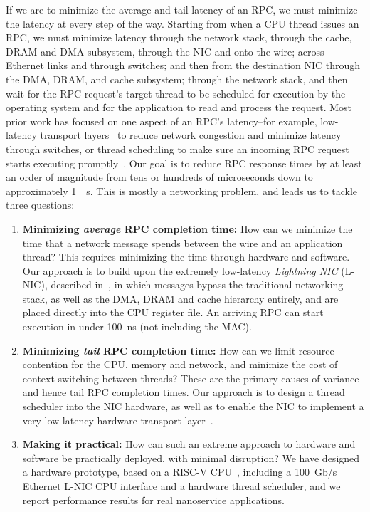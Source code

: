 If we are to minimize the average and tail latency of an RPC, we must minimize the latency at every step of the way. 
Starting from when a CPU thread issues an RPC, we must minimize latency through the network stack, through the cache, DRAM and DMA subsystem, through the NIC and onto the wire; across Ethernet links and through switches; and then from the destination NIC through the DMA, DRAM, and cache subsystem; through the network stack, and then wait for the RPC request's target thread to be scheduled for execution by the operating system and for the application to read and process the request.
Most prior work has focused on one aspect of an RPC's latency--for example, low-latency transport layers~\cite{homa, ndp, pfabric} to reduce network congestion and minimize latency through switches, or thread scheduling to make sure an incoming RPC request starts executing promptly~\cite{shinjuku, shenango}. 
Our goal is to reduce RPC response times by at least an order of magnitude from tens or hundreds of microseconds down to approximately \SI{1}{\mu s}. 
This is mostly a networking problem, and leads us to tackle three questions:

\begin{enumerate}[topsep=0.4\baselineskip, leftmargin=20pt]
    \item {\bf Minimizing {\em average} RPC completion time:} How can we minimize the time that a network message spends between the wire and an application thread?
    This requires minimizing the time through hardware and software. Our approach is to build upon the extremely low-latency {\em Lightning NIC} (L-NIC), described in~\cite{lnic}, in which messages bypass the traditional networking stack, as well as the DMA, DRAM and cache hierarchy entirely, and are placed directly into the CPU register file.
    An arriving RPC can start execution in under \SI{100}{ns} (not including the MAC). 
    \item {\bf Minimizing {\em tail} RPC completion time:} How can we limit resource contention for the CPU, memory and network, and minimize the cost of context switching between threads?
    These are the primary causes of variance and hence tail RPC completion times.
    Our approach is to design a thread scheduler into the NIC hardware, as well as to enable the NIC to implement a very low latency hardware transport layer~\cite{homa,ndp}.
    \item {\bf Making it practical:} How can such an extreme approach to hardware and software be practically deployed, with minimal disruption? 
    We have designed a hardware prototype, based on a RISC-V CPU~\cite{rocket-chip}, including a \SI{100}{Gb/s} Ethernet L-NIC CPU interface and a hardware thread scheduler, and we report performance results for real nanoservice applications.
\end{enumerate}

